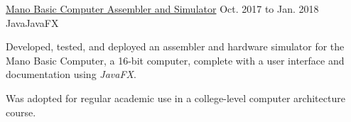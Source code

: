 \begin{cventry}
    {\href{https://github.com/TomerAberbach/mano-simulator}{Mano Basic Computer Assembler and Simulator}}{}
    {Oct. 2017 to Jan. 2018}
    {Java}{JavaFX}
    \begin{cvitems}
        \item Developed, tested, and deployed an assembler and hardware simulator for the Mano Basic Computer, a 16-bit computer, complete with a user interface and documentation using \textsl{JavaFX}.
        \item Was adopted for regular academic use in a college-level computer architecture course.
    \end{cvitems}
\end{cventry}
